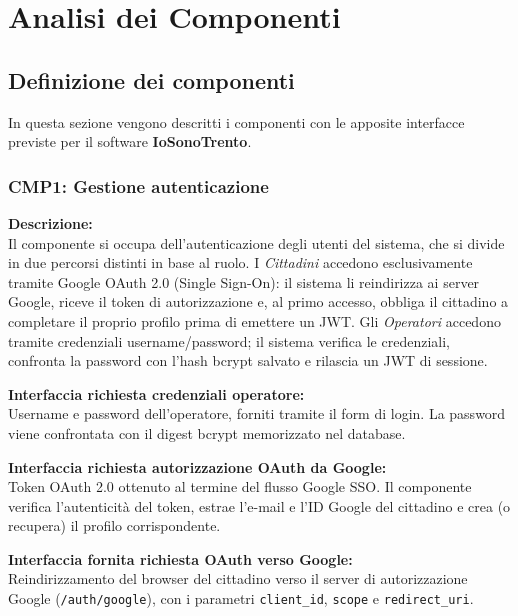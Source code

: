 \documentclass[12pt, a4paper]{article}
\newcommand{\interfacciarichiesta}[1]{\textbf{Interfaccia richiesta #1:}}
\newcommand{\interfacciafornita}[1]{\textbf{Interfaccia fornita #1:}}
\begin{document}
\section{Analisi dei Componenti}

\subsection{Definizione dei componenti}

In questa sezione vengono descritti i componenti con le apposite interfacce previste per il software
\textbf{IoSonoTrento}.

\subsubsection*{CMP1: Gestione autenticazione}

\textbf{Descrizione:}\\
Il componente si occupa dell'autenticazione degli utenti del sistema, che si divide in due percorsi
distinti in base al ruolo. I \textit{Cittadini} accedono esclusivamente tramite Google OAuth 2.0
(Single Sign-On): il sistema li reindirizza ai server Google, riceve il token di autorizzazione e,
al primo accesso, obbliga il cittadino a completare il proprio profilo prima di emettere un JWT.
Gli \textit{Operatori} accedono tramite credenziali username/password; il sistema verifica le
credenziali, confronta la password con l'hash bcrypt salvato e rilascia un JWT di sessione.

\interfacciarichiesta{credenziali operatore}\\
Username e password dell'operatore, forniti tramite il form di login. La password viene confrontata
con il digest bcrypt memorizzato nel database.

\interfacciarichiesta{autorizzazione OAuth da Google}\\
Token OAuth 2.0 ottenuto al termine del flusso Google SSO. Il componente verifica l'autenticità del
token, estrae l'e-mail e l'ID Google del cittadino e crea (o recupera) il profilo corrispondente.

\interfacciafornita{richiesta OAuth verso Google}\\
Reindirizzamento del browser del cittadino verso il server di autorizzazione Google
(\texttt{/auth/google}), con i parametri \texttt{client\_id}, \texttt{scope} e
\texttt{redirect\_uri}.
\end{document}
